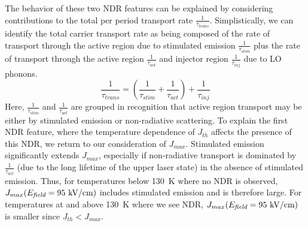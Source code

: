 The behavior of these two NDR features can be explained by considering contributions to the total per period transport rate $\frac{1}{\tau_\textit{trans}}$.  Simplistically, we can identify the total carrier transport rate as being composed of the rate of transport through the active region due to stimulated emission $\frac{1}{\tau_\textit{stim}}$ plus the rate of transport through the active region $\frac{1}{\tau_\textit{act}}$ and injector region $\frac{1}{\tau_\textit{inj}}$ due to LO phonons.
\begin{equation}
\frac{1}{\tau_\textit{trans}}=\left(\frac{1}{\tau_\textit{stim}}+\frac{1}{\tau_\textit{act}}\right)+\frac{1}{\tau_\textit{inj}}
\end{equation}
Here, $\frac{1}{\tau_\textit{stim}}$ and $\frac{1}{\tau_\textit{act}}$ are grouped in recognition that active region transport may be either by stimulated emission or non-radiative scattering.  To explain the first NDR feature, where the temperature dependence of $J_{th}$ affects the presence of this NDR, we return to our consideration of $J_{max}$.  Stimulated emission significantly extends $J_{max}$, especially if non-radiative transport is dominated by $\frac{1}{\tau_\textit{act}}$ (due to the long lifetime of the upper laser state) in the absence of stimulated emission.  Thus, for temperatures below 130~K where no NDR is observed, $J_{max}(E_\textit{field}=95~\textnormal{kV/cm})$ includes stimulated emission and is therefore large.  For temperatures at and above 130~K where we see NDR, $J_{max}(E_\textit{field}=95~\textnormal{kV/cm})$ is smaller since $J_{th}<J_{max}$.


